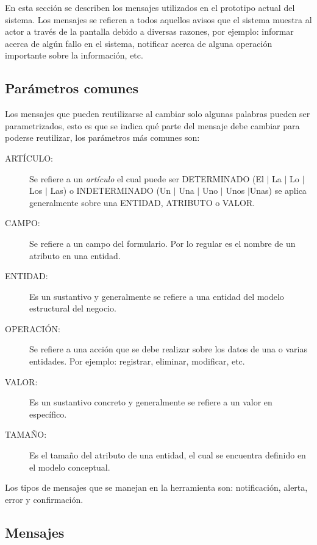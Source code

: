     En esta sección se describen los mensajes utilizados en el prototipo actual del sistema. Los mensajes se refieren a todos
    aquellos avisos que el sistema muestra al actor a través de la pantalla debido a diversas
    razones, por ejemplo: informar acerca de algún fallo en el sistema, notificar acerca de alguna operación importante sobre
    la información, etc.\\

\subsection{Parámetros comunes}
    Los mensajes que pueden reutilizarse al cambiar solo algunas palabras pueden ser parametrizados, esto es que se indica qué parte del mensaje 
    debe cambiar para poderse reutilizar, los parámetros más comunes son:

    \begin{description}
	\item [ARTÍCULO:] Se refiere a un {\em artículo} el cual puede ser DETERMINADO (El $\mid$ La $\mid$ Lo $\mid$ Los $\mid$ Las) o INDETERMINADO (Un $\mid$ Una $\mid$ 
	Uno $\mid$ Unos $\mid$Unas) se aplica generalmente sobre una ENTIDAD, ATRIBUTO o VALOR.
	\item [CAMPO:] Se refiere a un campo del formulario. Por lo regular es el nombre de un atributo en una entidad.
	\item [ENTIDAD:] Es un sustantivo y generalmente se refiere a una entidad del modelo estructural del negocio.
	\item [OPERACIÓN:] Se refiere a una acción que se debe realizar sobre los datos de una o varias entidades. Por ejemplo: registrar, eliminar, modificar, etc.
	\item [VALOR:] Es un sustantivo concreto y generalmente se refiere a un valor en específico. 
	\item [TAMAÑO:] Es el tamaño del atributo de una entidad, el cual se encuentra definido en el modelo conceptual. \
    \end{description}
    
    Los tipos de mensajes que se manejan en la herramienta son: notificación, alerta, error y confirmación.\\


\subsection{Mensajes}

